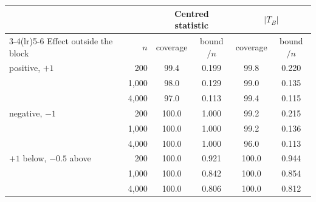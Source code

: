 \begin{tabular}{lrcccc}
\toprule
& & \multicolumn{2}{c}{Centred statistic} & \multicolumn{2}{c}{$|T_B|$} \\
\cmidrule(lr){3-4}\cmidrule(lr){5-6}
Effect outside the block & $n$ & coverage & bound$/n$ & coverage & bound$/n$ \\
\midrule
positive, $+1$ & 200 & 99.4 & 0.199 & 99.8 & 0.220 \\
 & 1,000 & 98.0 & 0.129 & 99.0 & 0.135 \\
 & 4,000 & 97.0 & 0.113 & 99.4 & 0.115 \\
negative, $-1$ & 200 & 100.0 & 1.000 & 99.2 & 0.215 \\
 & 1,000 & 100.0 & 1.000 & 99.2 & 0.136 \\
 & 4,000 & 100.0 & 1.000 & 96.0 & 0.113 \\
$+1$ below, $-0.5$ above & 200 & 100.0 & 0.921 & 100.0 & 0.944 \\
 & 1,000 & 100.0 & 0.842 & 100.0 & 0.854 \\
 & 4,000 & 100.0 & 0.806 & 100.0 & 0.812 \\
\bottomrule
\end{tabular}
